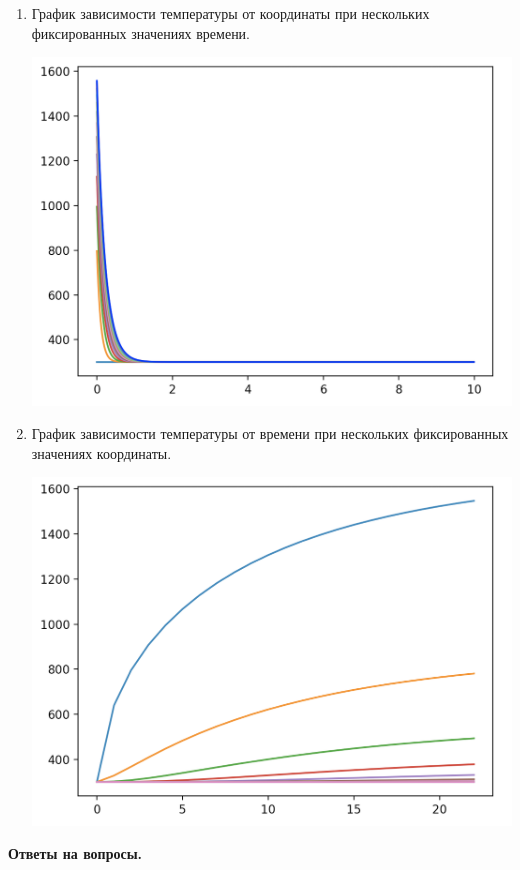 \documentclass[a4paper,14pt]{extreport} %
\begin{document}
\begin{enumerate}
\item График зависимости температуры от координаты при нескольких фиксированных значениях времени.

\includegraphics[scale=0.9]{1}
\item График зависимости температуры от времени при нескольких фиксированных значениях координаты. 

\includegraphics[scale=0.9]{2}

\end{enumerate}

\newpage
\textbf{Ответы на вопросы. }
\end{document}
